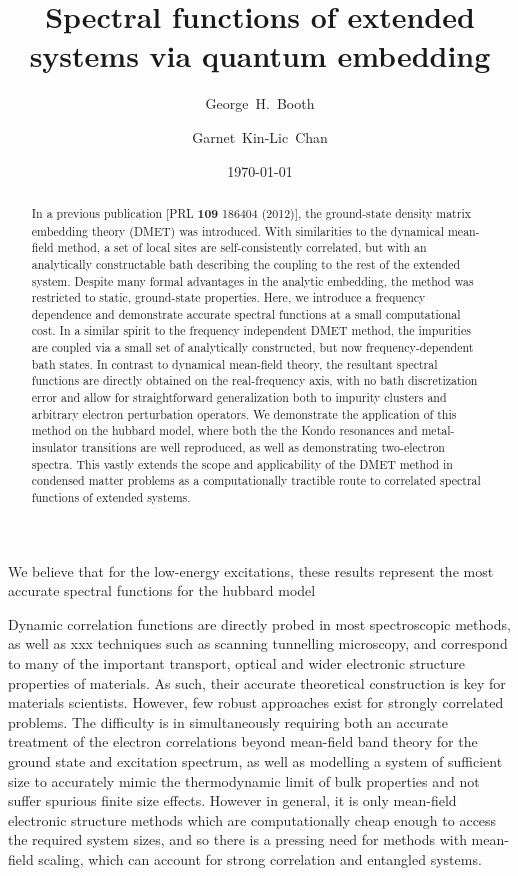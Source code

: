\documentclass[aps,showpacs,twocolumn,nobibnotes]{revtex4}
\begin{document}
\title{Spectral functions of extended systems via quantum embedding}
\author{George~H.~Booth}
\author{Garnet~Kin-Lic~Chan}  

\begin{abstract}
In a previous publication [PRL {\bf 109} 186404 (2012)], the ground-state density matrix embedding theory (DMET) was introduced. With similarities 
to the dynamical mean-field method, a set of local sites are self-consistently correlated, but with an analytically constructable bath describing the
coupling to the rest of the extended system. 
Despite many formal advantages in the analytic embedding, the method was restricted to static, ground-state properties.
Here, we introduce a frequency dependence and demonstrate accurate spectral functions at a small 
computational cost. In a similar spirit to the frequency independent DMET method, the impurities are coupled via a small set of 
analytically constructed, but now frequency-dependent bath states. In contrast to dynamical mean-field theory, the resultant 
spectral functions are directly obtained on the real-frequency axis, with no bath discretization error and allow for straightforward generalization both 
to impurity clusters and arbitrary electron perturbation operators. We demonstrate
the application of this method on the hubbard model, where both the the Kondo resonances and metal-insulator transitions are well reproduced, as well as 
demonstrating two-electron spectra. This vastly extends the scope and applicability 
of the DMET method in condensed matter problems as a computationally tractible route to correlated spectral functions of extended systems.
\end{abstract}
\date{\today}
\maketitle

We believe that for the low-energy excitations, these results represent the most accurate spectral functions for the hubbard model

Dynamic correlation functions are directly probed in most spectroscopic methods, as well as xxx techniques such as scanning tunnelling microscopy, 
and correspond to many of the important transport, optical and 
wider electronic structure properties of materials. As such, their accurate theoretical construction is key for materials scientists. 
However, few robust approaches exist for strongly correlated problems. The difficulty is in simultaneously requiring both an accurate 
treatment of the electron correlations beyond mean-field band theory for the ground state and excitation spectrum, as well as modelling 
a system of sufficient size to accurately mimic the thermodynamic limit of bulk properties and not suffer spurious finite size effects. 
However in general, it is only mean-field electronic structure methods which are computationally cheap enough to access the required system
sizes, and so there is a pressing need for methods with mean-field scaling, which can account for strong correlation and entangled systems.
\end{document}
